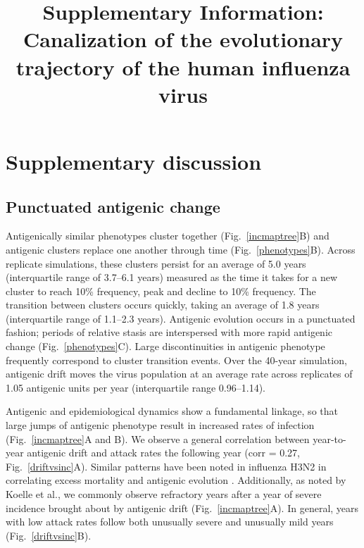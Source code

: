 \setcounter{figure}{0}
\setcounter{table}{0}
\setcounter{page}{1}
\renewcommand{\thefigure}{S\arabic{figure}}
\renewcommand{\thetable}{S\arabic{table}}
\renewcommand{\thepage}{S\arabic{page}}
  
\title{\Large \bf Supplementary Information: Canalization of the evolutionary trajectory of the human influenza virus}
\maketitle

\section*{Supplementary discussion}

\subsection*{Punctuated antigenic change}

Antigenically similar phenotypes cluster together (Fig.~\ref{incmaptree}B) and antigenic clusters replace one another through time (Fig.~\ref{phenotypes}B).  Across replicate simulations, these clusters persist for an average of 5.0 years (interquartile range of 3.7--6.1 years) measured as the time it takes for a new cluster to reach 10\% frequency, peak and decline to 10\% frequency.  The transition between clusters occurs quickly, taking an average of 1.8 years (interquartile range of 1.1--2.3 years).   Antigenic evolution occurs in a punctuated fashion; periods of relative stasis are interspersed with more rapid antigenic change (Fig.~\ref{phenotypes}C).  Large discontinuities in antigenic phenotype frequently correspond to cluster transition events.  Over the  40-year simulation, antigenic drift moves the virus population at an average rate across replicates of 1.05 antigenic units per year (interquartile range 0.96--1.14). 

Antigenic and epidemiological dynamics show a fundamental linkage, so that large jumps of antigenic phenotype result in increased rates of infection (Fig.~\ref{incmaptree}A and B).  We observe a general correlation between year-to-year antigenic drift and attack rates the following year (corr = 0.27, Fig.~\ref{driftvsinc}A).  Similar patterns have been noted in influenza H3N2 in correlating excess mortality and antigenic evolution \cite{Wu10}.  Additionally, as noted by Koelle et al.\cite{Koelle06}, we commonly observe refractory years after a year of severe incidence brought about by antigenic drift (Fig.~\ref{incmaptree}A).  In general, years with low attack rates follow both unusually severe and unusually mild years (Fig.~\ref{driftvsinc}B).  

